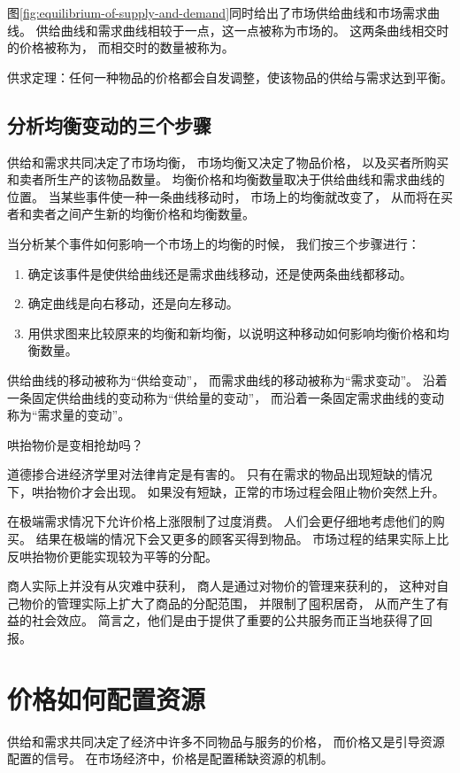 图\ref{fig:equilibrium-of-supply-and-demand}同时给出了市场供给曲线和市场需求曲线。
供给曲线和需求曲线相较于一点，这一点被称为市场的。
这两条曲线相交时的价格被称为，
而相交时的数量被称为。


供求定理：任何一种物品的价格都会自发调整，使该物品的供给与需求达到平衡。


\subsection{分析均衡变动的三个步骤}

供给和需求共同决定了市场均衡，
市场均衡又决定了物品价格，
以及买者所购买和卖者所生产的该物品数量。
均衡价格和均衡数量取决于供给曲线和需求曲线的位置。
当某些事件使一种一条曲线移动时，
市场上的均衡就改变了，
从而将在买者和卖者之间产生新的均衡价格和均衡数量。



当分析某个事件如何影响一个市场上的均衡的时候，
我们按三个步骤进行：
\begin{enumerate}
\item 确定该事件是使供给曲线还是需求曲线移动，还是使两条曲线都移动。
\item 确定曲线是向右移动，还是向左移动。
\item 用供求图来比较原来的均衡和新均衡，以说明这种移动如何影响均衡价格和均衡数量。
\end{enumerate}


供给曲线的移动被称为“供给变动”，
而需求曲线的移动被称为“需求变动”。
沿着一条固定供给曲线的变动称为“供给量的变动”，
而沿着一条固定需求曲线的变动称为“需求量的变动”。


\begin{tcolorbox}
  哄抬物价是变相抢劫吗？

  道德掺合进经济学里对法律肯定是有害的。
  只有在需求的物品出现短缺的情况下，哄抬物价才会出现。
  如果没有短缺，正常的市场过程会阻止物价突然上升。

  在极端需求情况下允许价格上涨限制了过度消费。
  人们会更仔细地考虑他们的购买。
  结果在极端的情况下会又更多的顾客买得到物品。
  市场过程的结果实际上比反哄抬物价更能实现较为平等的分配。

  商人实际上并没有从灾难中获利，
  商人是通过对物价的管理来获利的，
  这种对自己物价的管理实际上扩大了商品的分配范围，
  并限制了囤积居奇，
  从而产生了有益的社会效应。
  简言之，他们是由于提供了重要的公共服务而正当地获得了回报。
\end{tcolorbox}


\section{价格如何配置资源}

供给和需求共同决定了经济中许多不同物品与服务的价格，
而价格又是引导资源配置的信号。
在市场经济中，价格是配置稀缺资源的机制。







